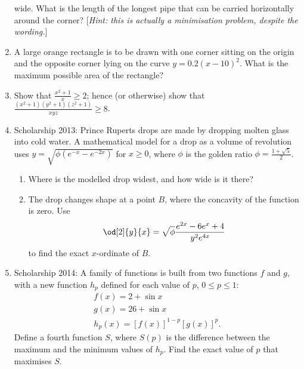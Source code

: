 \begin{enumerate}
        wide. What is the length of the longest pipe that can be carried horizontally around the corner? [\textit{Hint: this is actually
        a minimisation problem, despite the wording.}]
  \item A large orange rectangle is to be drawn with one corner sitting on the origin and the opposite corner lying on
        the curve $ y = 0.2(x - 10)^2 $. What is the maximum possible area of the rectangle?
        \begin{center}
        \end{center}
  \item Show that $ \frac{x^2 + 1}{x} \geq 2 $; hence (or otherwise) show that $ \frac{(x^2 + 1)(y^2 + 1)(z^2 + 1)}{xyz} \geq 8 $.
  \item Scholarship 2013: Prince Ruperts drops are made by dropping molten glass into cold water. A mathematical model for a drop
        as a volume of revolution uses $ y = \sqrt{\phi (e^{-x} - e^{-2x})} $ for $ x \geq 0 $, where $ \phi $ is the golden
        ratio $ \phi = \frac{1 + \sqrt{5}}{2} $.
    \begin{enumerate}
      \item Where is the modelled drop widest, and how wide is it there?
      \item The drop changes shape at a point $ B $, where the concavity of the function is zero. Use
            \begin{displaymath}
              \od[2]{y}{x} = \sqrt{\phi} \frac{e^{2x} - 6e^x + 4}{y^2 e^{4x}}
            \end{displaymath}
            to find the exact $ x$-ordinate of $ B $.
    \end{enumerate}
  \item Scholarship 2014: A family of functions is built from two functions $ f $ and $ g $, with a new function $ h_p $ defined
        for each value of $ p $, $ 0 \leq p \leq 1 $:
        \begin{gather*}
          f(x) = 2 + \sin x\\
          g(x) = 26 + \sin x\\
          h_p(x) = [f(x)]^{1 - p} [g(x)]^p.
        \end{gather*}
        Define a fourth function $ S $, where $ S(p) $ is the difference between the maximum and the minimum values of $ h_p $. Find
        the exact value of $ p $ that maximises $ S $.


\end{enumerate}
